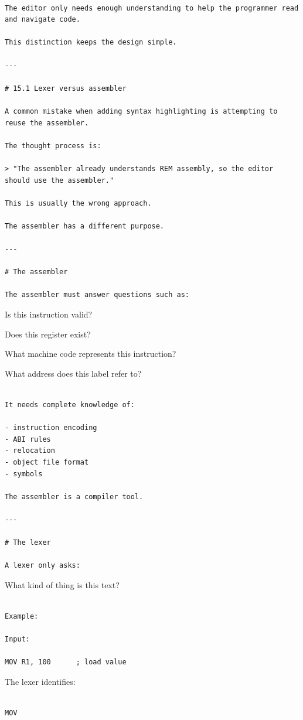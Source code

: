 \documentclass[
  oneside,
  openany]{book}
\begin{document}
\begin{verbatim}

The editor only needs enough understanding to help the programmer read and navigate code.

This distinction keeps the design simple.

---

# 15.1 Lexer versus assembler

A common mistake when adding syntax highlighting is attempting to reuse the assembler.

The thought process is:

> "The assembler already understands REM assembly, so the editor should use the assembler."

This is usually the wrong approach.

The assembler has a different purpose.

---

# The assembler

The assembler must answer questions such as:
\end{verbatim}

Is this instruction valid?

Does this register exist?

What machine code represents this instruction?

What address does this label refer to?

\begin{verbatim}

It needs complete knowledge of:

- instruction encoding
- ABI rules
- relocation
- object file format
- symbols

The assembler is a compiler tool.

---

# The lexer

A lexer only asks:
\end{verbatim}

What kind of thing is this text?

\begin{verbatim}

Example:

Input:

MOV R1, 100      ; load value
\end{verbatim}

The lexer identifies:

\begin{verbatim}

MOV
\end{verbatim}
\end{document}
